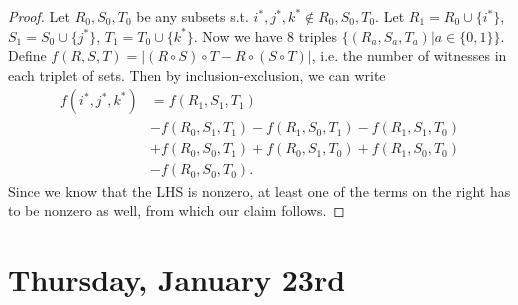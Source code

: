 \documentclass[11 pt]{scrartcl}
\begin{document}
\begin{example}
\begin{proof}
        Let $R_0, S_0, T_0$ be any subsets s.t. $i^*, j^*, k^* \not\in R_0, S_0, T_0$. Let $R_1 = R_0 \cup \{i^*\}$, $S_1 = S_0 \cup \{j^*\}$, $T_1 = T_0 \cup \{k^*\}$. Now we have 8 triples $\{(R_a, S_a, T_a) | a \in \{0,1\}\}$. Define $f(R, S, T) = |(R\circ S)\circ T - R\circ (S\circ T)|$, i.e. the number of witnesses in each triplet of sets. Then by inclusion-exclusion, we can write 
        \begin{align*}
            f(i^*, j^*, k^*) &= f(R_1, S_1, T_1) \\ 
                             &- f(R_0, S_1, T_1) - f(R_1, S_0, T_1) - f(R_1, S_1, T_0) \\ 
                             &+ f(R_0, S_0, T_1) + f(R_0, S_1, T_0) + f(R_1, S_0, T_0) \\ 
                             &- f(R_0, S_0, T_0).
        \end{align*}
        Since we know that the LHS is nonzero, at least one of the terms on the right has to be nonzero as well, from which our claim follows. 
    \end{proof}

\end{example}

\newpage
\section{Thursday, January 23rd}
\end{document}
